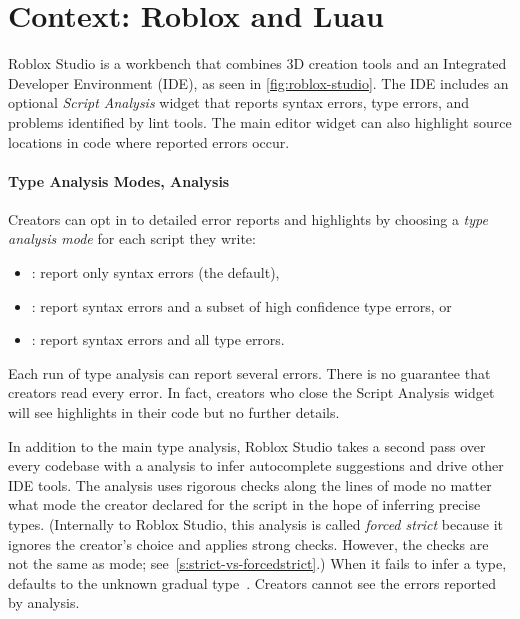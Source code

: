\documentclass[english,submission,cleveref]{programming}
\begin{document}
\section{Context: {Roblox} and {Luau}}
\label{s:context}

% 
% 


{Roblox Studio} is a workbench that
combines {3D creation} tools and an Integrated
Developer Environment (IDE), as seen in \cref{fig:roblox-studio}.
The IDE includes an optional \emph{Script Analysis} widget that
reports syntax errors, type errors, and problems identified by
lint tools. The main editor widget can also highlight
source locations in code where reported errors occur.


\paragraph{Type Analysis Modes, \FS{} Analysis}

Creators can opt in to detailed error reports and highlights by
choosing a \emph{type analysis mode} for each script they write:
\begin{itemize}
  \item \mnocheck{}: report only syntax errors (the default),
  \item \mnonstrict{}: report syntax errors and a subset of high confidence type errors, or
  \item \mstrict{}: report syntax errors and all type errors.
\end{itemize}
Each run of type analysis can report several errors.
There is no guarantee that creators read every error.
In fact, creators who close the Script Analysis widget
will see highlights in their code but no further details.

In addition to the main type analysis, Roblox Studio takes a second pass over
every codebase with a \emph{\FS{}} analysis to infer autocomplete suggestions
and drive other IDE tools.
The \FS{} analysis uses rigorous checks along the lines of \mstrict{} mode
no matter what mode the creator declared for the script in the hope of inferring
precise types.
(Internally to Roblox Studio, this analysis is called \emph{forced strict}
because it ignores the creator's choice and applies strong checks. However,
the checks are not the same as \mstrict{} mode;
see~\cref{s:strict-vs-forcedstrict}.)
When it fails to infer a type, \FS{} defaults to the unknown gradual
type~\cite{st-sfp-2006}.
Creators cannot see the errors reported by \FS{} analysis.
\end{document}
